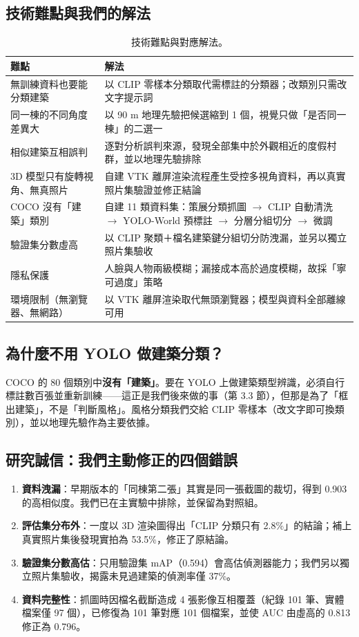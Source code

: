 \documentclass[11pt,a4paper,fontset=windows]{ctexart}
\begin{document}
\subsection{技術難點與我們的解法}
\begin{table}[H]
\centering\small
\begin{tabular}{@{}p{5.2cm}p{10.1cm}@{}}
\toprule
\textbf{難點} & \textbf{解法} \\
\midrule
無訓練資料也要能分類建築 & 以 CLIP 零樣本分類取代需標註的分類器；改類別只需改文字提示詞 \\
同一棟的不同角度差異大 & 以 90 m 地理先驗把候選縮到 1 個，視覺只做「是否同一棟」的二選一 \\
相似建築互相誤判 & 逐對分析誤判來源，發現全部集中於外觀相近的度假村群，並以地理先驗排除 \\
3D 模型只有旋轉視角、無真照片 & 自建 VTK 離屏渲染流程產生受控多視角資料，再以真實照片集驗證並修正結論 \\
COCO 沒有「建築」類別 & 自建 11 類資料集：策展分類抓圖 $\rightarrow$ CLIP 自動清洗 $\rightarrow$ YOLO-World 預標註 $\rightarrow$ 分層分組切分 $\rightarrow$ 微調 \\
驗證集分數虛高 & 以 CLIP 聚類＋檔名建築鍵分組切分防洩漏，並另以獨立照片集驗收 \\
隱私保護 & 人臉與人物兩級模糊；漏接成本高於過度模糊，故採「寧可過度」策略 \\
環境限制（無瀏覽器、無網路） & 以 VTK 離屏渲染取代無頭瀏覽器；模型與資料全部離線可用 \\
\bottomrule
\end{tabular}
\caption{技術難點與對應解法。}
\end{table}

\subsection{為什麼不用 YOLO 做建築分類？}
COCO 的 80 個類別中\textbf{沒有「建築」}。要在 YOLO 上做建築類型辨識，必須自行標註數百張並重新訓練——這正是我們後來做的事（第 3.3 節），但那是為了「框出建築」，不是「判斷風格」。風格分類我們交給 CLIP 零樣本（改文字即可換類別），並以地理先驗作為主要依據。

\subsection{研究誠信：我們主動修正的四個錯誤}
\begin{enumerate}[leftmargin=1.4em,itemsep=3pt]
  \item \textbf{資料洩漏}：早期版本的「同棟第二張」其實是同一張截圖的裁切，得到 0.903 的高相似度。我們已在主實驗中排除，並保留為對照組。
  \item \textbf{評估集分布外}：一度以 3D 渲染圖得出「CLIP 分類只有 2.8\%」的結論；補上真實照片集後發現實拍為 53.5\%，修正了原結論。
  \item \textbf{驗證集分數高估}：只用驗證集 mAP（0.594）會高估偵測器能力；我們另以獨立照片集驗收，揭露未見過建築的偵測率僅 37\%。
  \item \textbf{資料完整性}：抓圖時因檔名截斷造成 4 張影像互相覆蓋（紀錄 101 筆、實體檔案僅 97 個），已修復為 101 筆對應 101 個檔案，並使 AUC 由虛高的 0.813 修正為 0.796。
\end{enumerate}
\end{document}
